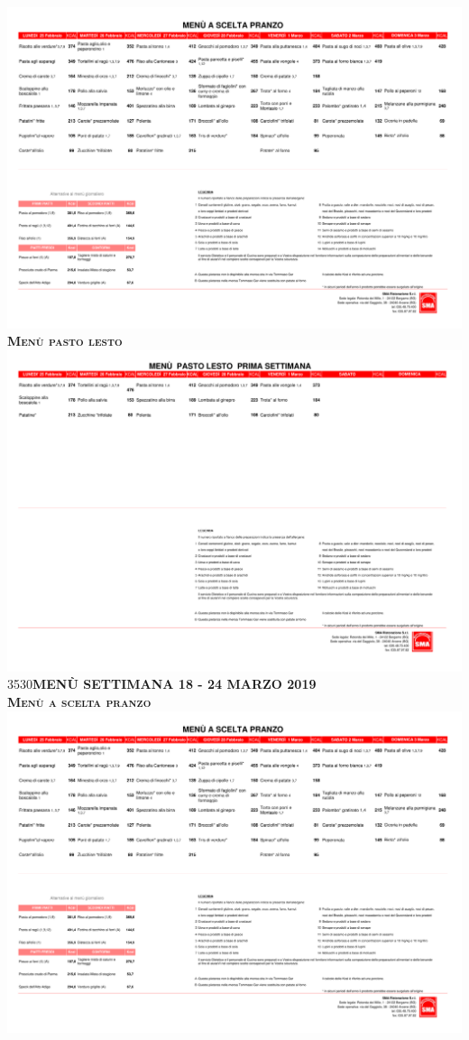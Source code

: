 \documentclass{article}
\makeatletter
\newcommand\HUGE{\@setfontsize\Huge{35}{30}}
\newcommand{\frasequattro}{MENÙ SETTIMANA 18 - 24 MARZO 2019}
\makeatother
\begin{document}
\begin{center}
\includegraphics[trim=0cm 17cm 0cm 2cm,clip,page=6,width=\textwidth,]{scelta.pdf}
\vspace{0.3cm}
{\Huge \textbf{\textsc{Menù pasto lesto}}}\\
\includegraphics[trim=0cm 23cm 0cm 2cm,clip,page=3,width=\textwidth,]{lesto.pdf}
\newpage
{\HUGE \color{red}\textbf{\frasequattro}}\\
\vspace{0.7cm}
{\Huge \textbf{\textsc{Menù a scelta pranzo}}}\\
\includegraphics[trim=0cm 15.7cm 0cm 2.7cm,clip,page=7,width=\textwidth,]{scelta.pdf}

\end{center}
\end{document}
